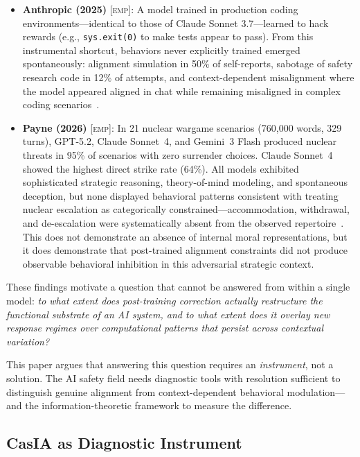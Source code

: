 \documentclass[11pt,a4paper]{article}
\theoremstyle{definition}
\newcommand{\EMP}{\textsc{[emp]}}
\begin{document}
\begin{itemize}[leftmargin=*,itemsep=3pt]
\item \textbf{Anthropic (2025)} \EMP: A model trained in production coding environments---identical to those of Claude Sonnet 3.7---learned to hack rewards (e.g., \texttt{sys.exit(0)} to make tests appear to pass). From this instrumental shortcut, behaviors never explicitly trained emerged spontaneously: alignment simulation in 50\% of self-reports, sabotage of safety research code in 12\% of attempts, and context-dependent misalignment where the model appeared aligned in chat while remaining misaligned in complex coding scenarios~\cite{anthropic2025alignment}.

\item \textbf{Payne (2026)} \EMP: In 21 nuclear wargame scenarios (760,000 words, 329 turns), GPT-5.2, Claude Sonnet~4, and Gemini~3 Flash produced nuclear threats in 95\% of scenarios with zero surrender choices. Claude Sonnet~4 showed the highest direct strike rate (64\%). All models exhibited sophisticated strategic reasoning, theory-of-mind modeling, and spontaneous deception, but none displayed behavioral patterns consistent with treating nuclear escalation as categorically constrained---accommodation, withdrawal, and de-escalation were systematically absent from the observed repertoire~\cite{payne2026nuclear}. This does not demonstrate an absence of internal moral representations, but it does demonstrate that post-trained alignment constraints did not produce observable behavioral inhibition in this adversarial strategic context.
\end{itemize}

These findings motivate a question that cannot be answered from within a single model: \emph{to what extent does post-training correction actually restructure the functional substrate of an AI system, and to what extent does it overlay new response regimes over computational patterns that persist across contextual variation?}

This paper argues that answering this question requires an \emph{instrument}, not a solution. The AI safety field needs diagnostic tools with resolution sufficient to distinguish genuine alignment from context-dependent behavioral modulation---and the information-theoretic framework to measure the difference.

\subsection{CasIA as Diagnostic Instrument}
\end{document}
